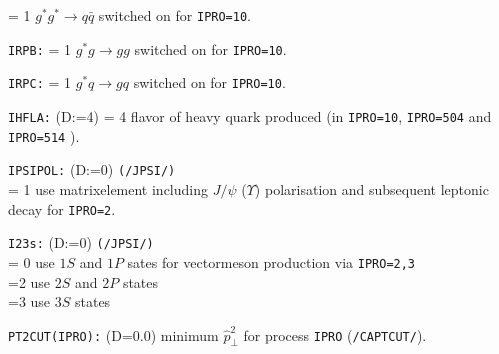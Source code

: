 \documentclass[11pt]{article} \usepackage{mystyle-new}
\newcommand{\deflab}[1]{#1\hfil}%
\newenvironment{defl}[1]%
  {\begin{list}{}{\settowidth{\labelwidth}{#1}%
  \setlength{\leftmargin}{\labelwidth}%
  \addtolength{\leftmargin}{\labelsep}%
  \setlength{\itemsep}{0pt plus 1pt}
  \setlength{\parsep}{0pt plus 1pt}
  \setlength{\topsep}{0pt plus 1pt}
  \setlength{\partopsep}{0pt plus 1pt}
  \setlength{\parskip}{2mm plus 1mm minus 1mm}
  \let\makelabel\deflab}}%
  {\end{list}}
\begin{document}
\begin{defl}{123456789012345}
			= 1   $g^* g^* \rightarrow q \bar{q}$ switched on for \verb+IPRO=10+.                    
\item[{\tt IRPB:}]  
			= 1   $g^* g \rightarrow gg$ switched on for \verb+IPRO=10+.                     
\item[{\tt IRPC:}]  
			= 1   $g^* q \rightarrow g q $ switched on for \verb+IPRO=10+.    
\item[{\tt IHFLA:}]   (D:=4)
			= 4 flavor of heavy quark produced (in \verb+IPRO=10+,   \verb+IPRO=504+ and \verb+IPRO=514+ ).		                 
\item[{\tt IPSIPOL:}]   (D:=0) {\tt (/JPSI/)}\\
			= 1   use matrixelement including $J/\psi$ ($\Upsilon$) polarisation and subsequent leptonic decay 
			 for \verb+IPRO=2+.    
\item[{\tt I23s:}]  (D:=0)  {\tt (/JPSI/)} \\
			= 0 use $1S$ and $1P$ sates for vectormeson production via \verb+IPRO=2,3+ \\
			=2 use $2S$ and $2P$ states \\
			=3 use $3S$ states		                  
\item[{\tt PT2CUT(IPRO):}] 
 (D=0.0) minimum $\hat{p}^2 _{\perp}$ for
                            process {\tt IPRO} ({\tt /CAPTCUT/}).       
\end{defl}
\end{document}
